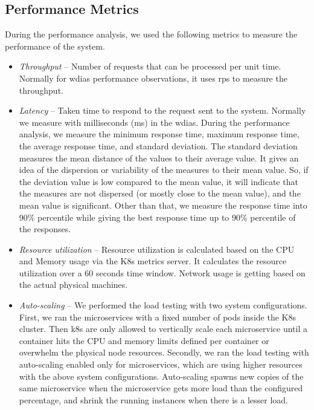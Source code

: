 \subsection{Performance Metrics}
\label{subse:test_plan_metrics}

During the performance analysis, we used the following metrics to measure the performance of the system.
\begin{itemize}
    \item \emph{Throughput} -- Number of requests that can be processed per unit time. 
    Normally for \acrshort{wdias} performance observations, it uses \acrfull{rps} to measure the throughput.
    \item \emph{Latency} -- Taken time to respond to the request sent to the system. 
    Normally we measure with milliseconds (ms) in the \acrshort{wdias}. During the performance analysis, we measure the minimum response time, maximum response time, the average response time, and standard deviation. The standard deviation measures the mean distance of the values to their average value. It gives an idea of the dispersion or variability of the measures to their mean value. So, if the deviation value is low compared to the mean value, it will indicate that the measures are not dispersed (or mostly close to the mean value), and the mean value is significant. Other than that, we measure the response time into 90\% percentile while giving the best response time up to 90\% percentile of the responses.
    \item \emph{Resource utilization} -- Resource utilization is calculated based on the CPU and Memory usage via the K8s metrics server. It calculates the resource utilization over a 60 seconds time window. Network usage is getting based on the actual physical machines.
    \item \emph{Auto-scaling} -- We performed the load testing with two system configurations. First, we ran the microservices with a fixed number of pods inside the K8s cluster. Then k8s are only allowed to vertically scale each microservice until a container hits the CPU and memory limits defined per container or overwhelm the physical node resources. Secondly, we ran the load testing with auto-scaling enabled only for microservices, which are using higher resources with the above system configurations. Auto-scaling spawns new copies of the same microservice when the microservice gets more load than the configured percentage, and shrink the running instances when there is a lesser load.
\end{itemize}
